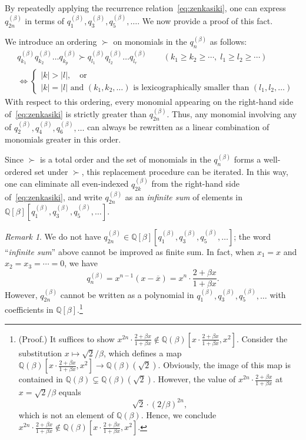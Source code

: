 \documentclass[dvipdfmx]{amsart}
\theoremstyle{definition}
\theoremstyle{remark}
\newtheorem*{remark}{Remark}%
\begin{document}
By repeatedly applying the recurrence relation~\eqref{eq:zenkasiki}, one can express \( q_{2n}^{(\beta)} \) in terms of \( q_1^{(\beta)}, q_3^{(\beta)}, q_5^{(\beta)}, \dots \). We now provide a proof of this fact.

We introduce an ordering \( \succ \) on monomials in the \( q_n^{(\beta)} \) as follows:
\[
\begin{aligned}
& q_{k_1}^{(\beta)} q_{k_2}^{(\beta)} \dots q_{k_p}^{(\beta)} 
\succ 
q_{l_1}^{(\beta)} q_{l_2}^{(\beta)} \dots q_{l_r}^{(\beta)} 
\qquad (k_1 \geq k_2 \geq \cdots,\; l_1 \geq l_2 \geq \cdots)
\\
& \iff
\begin{cases}
|k| > |l|,\quad \text{or} \\
|k| = |l| \text{ and } (k_1, k_2, \dots) 
\text{ is lexicographically smaller than } (l_1, l_2, \dots)
\end{cases}
\end{aligned}
\]
With respect to this ordering, every monomial appearing on the right-hand side of~\eqref{eq:zenkasiki} is strictly greater than \( q_{2n}^{(\beta)} \). Thus, any monomial involving any of \( q_2^{(\beta)}, q_4^{(\beta)}, q_6^{(\beta)}, \dots \) can always be rewritten as a linear combination of monomials greater in this order.

Since \( \succ \) is a total order and the set of monomials in the \( q_n^{(\beta)} \) forms a well-ordered set under \( \succ \), this replacement procedure can be iterated. In this way, one can eliminate all even-indexed \( q_{2k}^{(\beta)} \) from the right-hand side of~\eqref{eq:zenkasiki}, and write \( q_{2n}^{(\beta)} \) as an \textit{infinite sum} of elements in \( \mathbb{Q}[\beta][q_1^{(\beta)}, q_3^{(\beta)}, q_5^{(\beta)}, \dots] \).

\begin{remark}
We do not have \( q_{2n}^{(\beta)} \in \mathbb{Q}[\beta][q_1^{(\beta)}, q_3^{(\beta)}, q_5^{(\beta)}, \dots] \); the word ``\textit{infinite sum}'' above cannot be improved as finite sum.
In fact, when \( x_1 = x \) and \( x_2 = x_3 = \cdots = 0 \), we have
\[
q_n^{(\beta)} = x^{n-1}(x - \overline{x}) = x^n \cdot \frac{2 + \beta x}{1 + \beta x}.
\]
However, \( q_{2n}^{(\beta)} \) cannot be written as a polynomial in \( q_1^{(\beta)}, q_3^{(\beta)}, q_5^{(\beta)}, \dots \) with coefficients in \( \mathbb{Q}[\beta] \).\footnote{
(Proof.) It suffices to show \( x^{2n} \cdot \frac{2 + \beta x}{1 + \beta x} \notin \mathbb{Q}(\beta)[x \cdot \frac{2 + \beta x}{1 + \beta x}, x^2] \). 
Consider the substitution \( x \mapsto \sqrt{2}/\beta \), which defines a map
$
\mathbb{Q}(\beta)[x \cdot \tfrac{2 + \beta x}{1 + \beta x}, x^2] \to \mathbb{Q}(\beta)(\sqrt{2})
$.
Obviously, the image of this map is contained in \( \mathbb{Q}(\beta) \subsetneq \mathbb{Q}(\beta)(\sqrt{2}) \).
However, the value of \( x^{2n} \cdot \frac{2 + \beta x}{1 + \beta x} \) at \( x = \sqrt{2}/\beta \) equals
\[
\sqrt{2} \cdot (2/\beta)^{2n},
\] 
which is not an element of $\mathbb{Q}(\beta)$.
Hence, we conclude \( x^{2n} \cdot \frac{2 + \beta x}{1 + \beta x} \notin \mathbb{Q}(\beta)[x \cdot \frac{2 + \beta x}{1 + \beta x}, x^2] \).
}
\end{remark}
\end{document}
